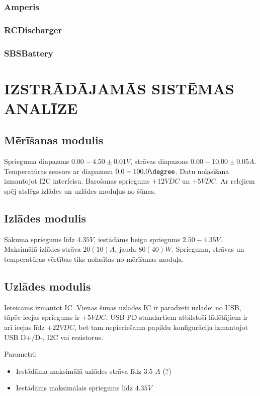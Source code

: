 \documentclass[12pt,fleqn,titlepage,oneside]{article}
\numberwithin{equation}{section}
\numberwithin{figure}{section}
\numberwithin{table}{section}
\begin{document}
\subsubsection{Amperis}

\subsubsection{RCDischarger}

\subsubsection{SBSBattery}

\clearpage
\section{\texorpdfstring{\MakeUppercase{Izstrādājamās sistēmas analīze}}{Izstrādājamās sistēmas analīze}}

\subsection{Mērīšanas modulis}

Sprieguma diapazons $0.00-4.50\pm0.01 V$, strāvas diapazons $0.00-10.00\pm0.05 A$. Temperatūras sensors ar diapazonu $0.0-100.0\degree $. 
Datu nolasīšana izmantojot I2C interfeisu.
Barošanas spriegums $+12VDC$ un $+5VDC$. 
Ar relejiem spēj atslēgs izlādes un uzlādes moduļus no šūnas.

\subsection{Izlādes modulis}

Sākuma spriegums līdz $4.35V$, iestādāms beigu spriegums $2.50-4.35 V$.
Maksimālā izlādes strāva $20(10) A$, jauda $80(40) W$.
Sprieguma, strāvas un temperatūras vērtības tiks nolasītas no mērīšanas moduļa. 

\subsection{Uzlādes modulis}

Ieteicams izmantot IC. Vienas šūnas uzlādes IC ir paradzēti uzlādei no USB, tāpēc ieejas spriegums ir $+5VDC$. USB PD standartiem atbilstoši lādētājiem ir arī ieejas līdz $+22VDC$, bet tam nepieciešama papildu konfigurācija izmantojot USB D+/D-, I2C vai rezistorus.

Parametri:
\begin{itemize}
	\item Iestādāma maksimālā uzlādes strāva līdz 3.5 $A$ (?) %
	\item Iestādāms maksimālais spriegums līdz $4.35 V$
\end{itemize}
\end{document}
